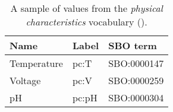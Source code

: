 \begin{table}[h]
  \centering
  \begin{tabular}{l>{\ttfamily}l>{\ttfamily}l}
    \toprule
    \textbf{Name}   & \textbf{\rmfamily Label} & \textbf{\rmfamily SBO term} \\
    \midrule
    Temperature   & pc:T  & SBO:0000147\\
    Voltage       & pc:V  & SBO:0000259\\
    pH            & pc:pH & SBO:0000304\\
    \bottomrule
  \end{tabular}
  \caption{A sample of values from the \emph{physical
      characteristics} vocabulary ().}
  \label{tab:af:physical-characteristics-cv}
\end{table}



